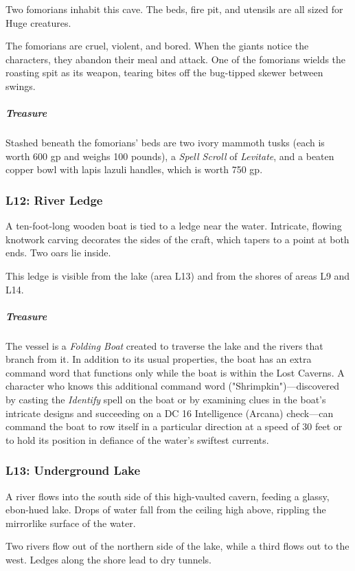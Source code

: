 \documentclass[10pt,a4paper,twoside,bg=print,twocolumn,openany,nodeprecatedcode]{dndbook}
\begin{document}
Two fomorians inhabit this cave. The beds, fire pit, and utensils are all sized for Huge creatures.

The fomorians are cruel, violent, and bored. When the giants notice the characters, they abandon their meal and attack. One of the fomorians wields the roasting spit as its weapon, tearing bites off the bug-tipped skewer between swings.

\subparagraph{Treasure}
Stashed beneath the fomorians' beds are two ivory mammoth tusks (each is worth 600 gp and weighs 100 pounds), a \textit{Spell Scroll} of \textit{Levitate}, and a beaten copper bowl with lapis lazuli handles, which is worth 750 gp.

\subsubsection{L12: River Ledge}
\begin{DndReadAloud}{}
A ten-foot-long wooden boat is tied to a ledge near the water. Intricate, flowing knotwork carving decorates the sides of the craft, which tapers to a point at both ends. Two oars lie inside.

\end{DndReadAloud}

This ledge is visible from the lake (area L13) and from the shores of areas L9 and L14.

\subparagraph{Treasure}
The vessel is a \textit{Folding Boat} created to traverse the lake and the rivers that branch from it. In addition to its usual properties, the boat has an extra command word that functions only while the boat is within the Lost Caverns. A character who knows this additional command word ("Shrimpkin")—discovered by casting the \textit{Identify} spell on the boat or by examining clues in the boat's intricate designs and succeeding on a DC 16 Intelligence (Arcana) check—can command the boat to row itself in a particular direction at a speed of 30 feet or to hold its position in defiance of the water's swiftest currents.

\subsubsection{L13: Underground Lake}
\begin{DndReadAloud}{}
A river flows into the south side of this high-vaulted cavern, feeding a glassy, ebon-hued lake. Drops of water fall from the ceiling high above, rippling the mirrorlike surface of the water.

Two rivers flow out of the northern side of the lake, while a third flows out to the west. Ledges along the shore lead to dry tunnels.

\end{DndReadAloud}
\end{document}
